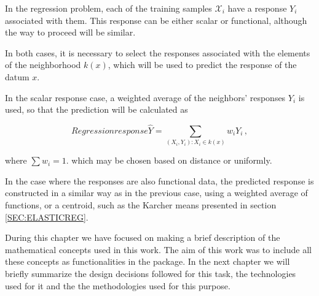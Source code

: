In the regression problem, each of the training samples $\mathcal{X}_i$ have a
response $Y_i$ associated with them. This response can be either scalar or
functional, although the way to proceed will be similar.

In both cases, it is necessary to select the responses associated with the
elements of the neighborhood $k(x)$, which will be used to predict the response
of the datum $x$.

In the scalar response case, a weighted average of the neighbors’ responses
$Y_i$ is used, so that the prediction will be calculated as

\begin{equation}{Regression response}
\hat Y = \sum_{(X_i, Y_i) : X_i \in k(x)} w_i Y_i \, ,
\end{equation}

where $\sum w_i = 1$.
which may be chosen based on distance or uniformly.

In the case where the responses are also functional data,
the predicted response is constructed in a similar way as in the previous
case, using a weighted average of functions, or a centroid, such as the
Karcher means presented in section \ref{SEC:ELASTICREG}.

During this chapter we have focused on making a brief description of the
mathematical concepts used in this work. The aim of this work was to include
all these concepts as functionalities in the  package.
In the next chapter we will briefly summarize the design decisions followed for
this task, the technologies used for it and the the methodologies used for this
purpose.
